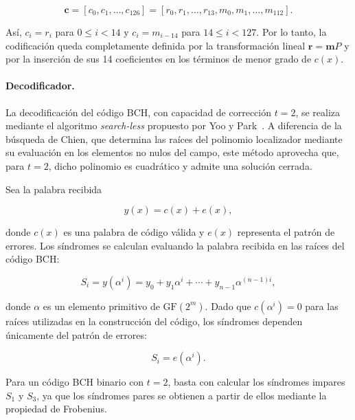 \documentclass[10pt,a4paper]{article}
\begin{document}
\begin{equation}
    \mathbf{c}
    =
    [c_0,c_1,\ldots,c_{126}]
    =
    [r_0,r_1,\ldots,r_{13},m_0,m_1,\ldots,m_{112}].
    \label{eq:formacion-codeword}
\end{equation}

Así, $c_i=r_i$ para $0\leq i<14$ y $c_i=m_{i-14}$ para
$14\leq i<127$. Por lo tanto, la codificación queda completamente definida por
la transformación lineal $\mathbf{r}=\mathbf{m}P$ y por la inserción de sus 14
coeficientes en los términos de menor grado de $c(x)$.


\paragraph{Decodificador.}

La decodificación del código BCH, con capacidad de corrección $t=2$,
se realiza mediante el algoritmo \textit{search-less} propuesto por
Yoo y Park~\cite{yoo2014}. A diferencia de la búsqueda de Chien,
que determina las raíces del polinomio localizador mediante su
evaluación en los elementos no nulos del campo, este método
aprovecha que, para $t=2$, dicho polinomio es cuadrático y admite
una solución cerrada.

Sea la palabra recibida

\begin{equation}
    y(x)=c(x)+e(x),
\end{equation}

donde $c(x)$ es una palabra de código válida y $e(x)$ representa
el patrón de errores. Los síndromes se calculan evaluando la palabra
recibida en las raíces del código BCH:

\begin{equation}
    S_i=y(\alpha^i)
    =y_0+y_1\alpha^i+\cdots+y_{n-1}\alpha^{(n-1)i},
\end{equation}

donde $\alpha$ es un elemento primitivo de $\mathrm{GF}(2^m)$.
Dado que $c(\alpha^i)=0$ para las raíces utilizadas en la
construcción del código, los síndromes dependen únicamente
del patrón de errores:

\begin{equation}
    S_i=e(\alpha^i).
\end{equation}

Para un código BCH binario con $t=2$, basta con calcular
los síndromes impares $S_1$ y $S_3$, ya que los síndromes
pares se obtienen a partir de ellos mediante la propiedad
de Frobenius.
\end{document}
